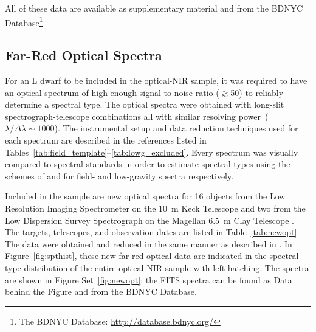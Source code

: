 \documentclass[modern]{aastex61}
\begin{document}
All of these data are available as supplementary material and from the BDNYC Database\footnote{The BDNYC Database: \url{http://database.bdnyc.org/}}. 

\subsection{Far-Red Optical Spectra}
\label{sec:obs_new_opt}

For an L dwarf to be included in the optical-NIR sample, it was required to have an optical spectrum of high enough signal-to-noise ratio ($\gtrsim$50) to reliably determine a spectral type.
The optical spectra were obtained with long-slit spectrograph-telescope combinations all with similar resolving power~($\lambda/\Delta\lambda\sim1000$).
The instrumental setup and data reduction techniques used for each spectrum are described in the references listed in Tables~\ref{tab:field_template}--\ref{tab:lowg_excluded}.
Every spectrum was visually compared to spectral standards in order to estimate spectral types using the schemes of \citet{K99} and \cite{Cruz09_lowg} for field- and low-gravity spectra respectively.

Included in the sample are new optical spectra for 16 objects from the Low Resolution Imaging Spectrometer on the 10~m Keck Telescope \citep[LRIS]{LRIS} and two from the Low Dispersion Survey Spectrograph on the Magellan 6.5~m Clay Telescope \citep[LDSS-3]{LDSS2}.
The targets, telescopes, and observation dates are listed in Table~\ref{tab:newopt}.
The data were obtained and reduced in the same manner as described in \citet{Kirkpatrick10}.
In Figure~\ref{fig:spthist}, these new far-red optical data are indicated in the spectral type distribution of the entire optical-NIR sample with left hatching.
The spectra are shown in Figure Set~\ref{fig:newopt}; the FITS spectra can be found as Data behind the Figure and from the BDNYC Database.

\figsetstart
{}

\figsetgrpstart
{}
\figsetgrpend
\end{document}
